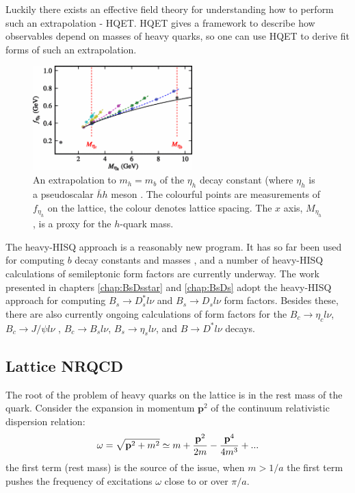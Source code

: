     Luckily there exists an effective field theory for understanding how to perform such an extrapolation - HQET. HQET gives a framework to describe how observables depend on masses of heavy quarks, so one can use HQET to derive fit forms of such an extrapolation.

    \begin{figure}
      \begin{center}
        \includegraphics[width=
          0.55\textwidth]{images/fetah_heavyhisq.png}
      \end{center}
      \vspace{-5pt}
      \caption{An extrapolation to $m_h=m_b$ of the $\eta_h$ decay constant (where $\eta_h$ is a pseudoscalar $\bar{h}h$ meson \cite{McNeile:2012qf}. The colourful points are measurements of $f_{\eta_h}$ on the lattice, the colour denotes lattice spacing. The $x$ axis, $M_{\eta_h}$, is a proxy for the $h$-quark mass.}
    \end{figure}

    The heavy-HISQ approach is a reasonably new program. It has so far been used for computing $b$ decay constants and masses \cite{McNeile:2012qf}, and a number of heavy-HISQ calculations of semileptonic form factors are currently underway. The work presented in chapters \ref{chap:BsDsstar} and \ref{chap:BsDs} adopt the heavy-HISQ approach for computing $B_s\to D_s^*l\nu$ and $B_s\to D_sl\nu$ form factors. Besides these, there are also currently ongoing calculations of form factors for the $B_c\to \eta_cl\nu$, $B_c\to J/\psi l\nu$ \cite{Lytle:2016ixw}, $B_c\to B_sl\nu$, $B_s\to \eta_sl\nu$, and $B\to D^*l\nu$ decays.

    \subsection{Lattice NRQCD}

    The root of the problem of heavy quarks on the lattice is in the rest mass of the quark. Consider the expansion in momentum $\textbf{p}^2$ of the continuum relativistic dispersion relation:
    \begin{align}
      \omega = \sqrt{{\textbf{p}}^2 + m^2} \simeq m + {{\textbf{p}}^2\over 2m} - {{\textbf{p}}^4\over 4m^3} + ...
      \label{eq:rel_expansion}
    \end{align}
    the first term (rest mass) is the source of the issue, when $m > 1/a$ the first term pushes the frequency of excitations $\omega$ close to or  over $\pi/a$.

